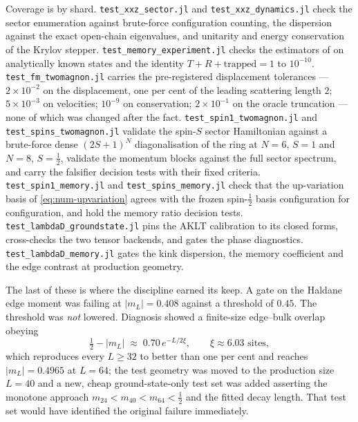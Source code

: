 Coverage is by shard.
\texttt{test\_\allowbreak{}xxz\_\allowbreak{}sector.jl} and \texttt{test\_\allowbreak{}xxz\_\allowbreak{}dynamics.jl} check the
sector enumeration against brute-force configuration counting, the dispersion
against the exact open-chain eigenvalues, and unitarity and energy
conservation of the Krylov stepper.
\texttt{test\_\allowbreak{}memory\_\allowbreak{}experiment.jl} checks the estimators of
 on analytically known states and the
identity $T+R+\text{trapped}=1$ to $10^{-10}$.
\texttt{test\_\allowbreak{}fm\_\allowbreak{}twomagnon.jl} carries the pre-registered displacement
tolerances --- $2\times10^{-2}$ on the displacement, one per cent of the
leading scattering length $2$; $5\times10^{-3}$ on velocities;
$10^{-9}$ on conservation; $2\times10^{-1}$ on the oracle truncation --- none
of which was changed after the fact.
\texttt{test\_\allowbreak{}spin1\_\allowbreak{}twomagnon.jl} and \texttt{test\_\allowbreak{}spins\_\allowbreak{}twomagnon.jl}
validate the spin-$S$ sector Hamiltonian against a brute-force dense
$(2S+1)^N$ diagonalisation of the ring at $N=6$, $S=1$ and $N=8$,
$S=\tfrac12$, validate the momentum blocks against the full sector spectrum,
and carry the falsifier decision tests with their fixed criteria.
\texttt{test\_\allowbreak{}spin1\_\allowbreak{}memory.jl} and \texttt{test\_\allowbreak{}spins\_\allowbreak{}memory.jl} check that
the up-variation basis of \cref{eq:num-upvariation} agrees with the frozen
spin-$\tfrac12$ basis configuration for configuration, and hold the memory
ratio decision tests.
\texttt{test\_\allowbreak{}lambdaD\_\allowbreak{}groundstate.jl} pins the AKLT calibration to its closed
forms, cross-checks the two tensor backends, and gates the phase diagnostics.
\texttt{test\_\allowbreak{}lambdaD\_\allowbreak{}memory.jl} gates the kink dispersion, the memory
coefficient and the edge contrast at production geometry.

The last of these is where the discipline earned its keep. A gate on the
Haldane edge moment was failing at $|m_L| = 0.408$ against a threshold of
$0.45$. The threshold was \emph{not} lowered. Diagnosis showed a finite-size
edge--bulk overlap obeying
\begin{equation}
  \tfrac12 - |m_L| \;\approx\; 0.70\,e^{-L/2\xi}, \qquad \xi \approx 6.03
  \text{ sites},
  \label{eq:num-edge-fss}
\end{equation}
which reproduces every $L\geq32$ to better than one per cent and reaches
$|m_L| = 0.4965$ at $L=64$; the test geometry was moved to the production size
$L=40$ and a new, cheap ground-state-only test set was added asserting the
monotone approach $m_{24}<m_{40}<m_{64}<\tfrac12$ and the fitted decay length.
That test set would have identified the original failure immediately.

